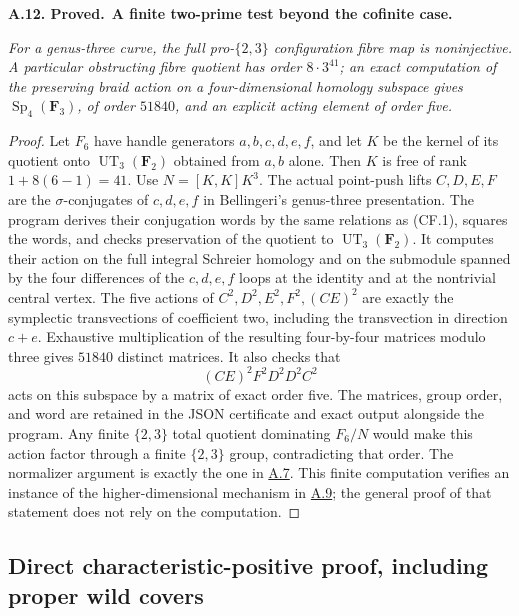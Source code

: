 \documentclass[11pt,a4paper]{article}
\newcommand{\F}{\mathbf F}
\newenvironment{claim}[3]{\par\medskip\noindent\hypertarget{#1}{\textbf{#1. #2.}}\ \textbf{#3.}\par\nopagebreak\smallskip\begingroup\itshape}{\endgroup\par\smallskip}
\newcommand{\statementref}[1]{\hyperlink{#1}{#1}}
\begin{document}
\begin{claim}{A.12}{Proved}{A finite two-prime test beyond the cofinite case}
For a genus-three curve, the full pro-$\{2,3\}$ configuration fibre
map is noninjective. A particular obstructing fibre quotient has order
$8\cdot3^{41}$; an exact computation of the preserving braid action
on a four-dimensional homology subspace gives
$\operatorname{Sp}_4(\F_3)$, of order $51840$, and an explicit
acting element of order five.
\end{claim}
\begin{proof}
Let $F_6$ have handle generators $a,b,c,d,e,f$, and let $K$ be the
kernel of its quotient onto $\operatorname{UT}_3(\F_2)$ obtained
from $a,b$ alone. Then $K$ is free of rank $1+8(6-1)=41$.
Use $N=[K,K]K^3$. The actual point-push lifts
$C,D,E,F$ are the $\sigma$-conjugates of $c,d,e,f$ in Bellingeri's
genus-three presentation. The program
 derives their
conjugation words by the same relations as (CF.1), squares the words,
and checks preservation of the quotient to $\operatorname{UT}_3(\F_2)$.
It computes their action on the full integral Schreier homology and
on the submodule spanned by the four differences of the $c,d,e,f$
loops at the identity and at the nontrivial central vertex.
The five actions of $C^2,D^2,E^2,F^2,(CE)^2$ are exactly the
symplectic transvections of coefficient two, including the
transvection in direction $c+e$. Exhaustive multiplication of the
resulting four-by-four matrices modulo three gives $51840$ distinct
matrices. It also checks that
\[
                    (CE)^2 F^2 D^2 D^2 C^2
\]
acts on this subspace by a matrix of exact order five.
The matrices, group order, and word are retained in the JSON
certificate and exact output alongside the program. Any finite
$\{2,3\}$ total quotient dominating $F_6/N$ would make this action
factor through a finite $\{2,3\}$ group, contradicting that order.
The normalizer argument is exactly the one in
\statementref{A.7}. This finite computation verifies an instance
of the higher-dimensional mechanism in \statementref{A.9}; the
general proof of that statement does not rely on the computation.
\end{proof}

\subsection{Direct characteristic-positive proof, including proper wild covers}
\end{document}

